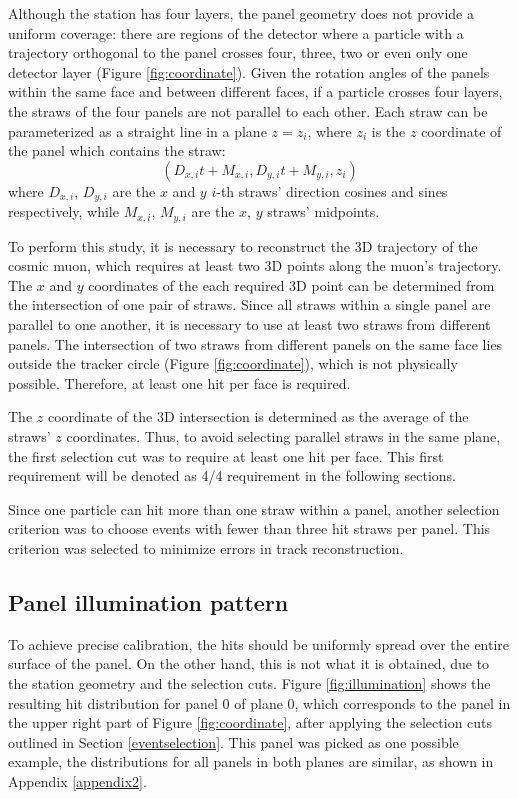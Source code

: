 Although the station has four layers, 
the panel geometry does not provide a uniform
coverage: there are regions of the 
detector where a particle with a trajectory orthogonal
to the panel crosses four, three, two or even only one 
detector layer (Figure \ref{fig:coordinate}). Given the
rotation angles of the panels within the same 
face and between different faces, if a particle
crosses four layers, the straws of the four 
panels are not parallel to each other.
Each straw can be parameterized as a straight line 
in a plane $z = z_i$, where $z_i$ is the $z$ 
coordinate of the panel which contains the straw:
\begin{equation}\label{equaretta}
    (D_{x,i}t+M_{x,i},D_{y,i}t+M_{y,i},z_i)
\end{equation}
where $D_{x,i}$, $D_{y,i}$ are the $x$ and $y$ 
$i$-th straws' direction cosines and sines respectively, 
while $M_{x,i}$, $M_{y,i}$ are the $x$, $y$ straws' midpoints.

To perform this study, it is necessary to 
reconstruct the 3D trajectory of the cosmic muon, 
which requires at least two 3D points along the muon's 
trajectory. The $x$ and $y$ coordinates of 
the each required 3D point can be determined 
from the intersection of one pair of straws. Since all straws within a single panel are parallel to 
one another, it is necessary to use at least two straws from 
different panels. The intersection of two straws from 
different panels on the same face lies outside the tracker circle 
(Figure \ref{fig:coordinate}), which is not physically possible. 
Therefore, at least one hit per face is required.

The $z$ coordinate of the 3D intersection is determined as the average of the 
straws' $z$ coordinates. Thus, to avoid selecting 
parallel straws in the same plane, 
the first selection cut 
was to require at least one hit per face. 
This first requirement will be denoted as 
4/4 requirement in the following sections.

Since one particle can hit more than one straw within a panel, 
another selection criterion was to choose events 
with fewer than three hit straws per panel. 
This criterion was selected to minimize errors 
in track reconstruction.
\subsection{Panel illumination pattern}
To achieve precise calibration, the hits should be uniformly 
spread over the entire surface of the panel.
On the other hand, this is 
not what it is obtained, due to the station geometry
and the selection cuts. 
Figure \ref{fig:illumination} shows the 
resulting hit distribution for panel 0 of
plane 0, which corresponds 
to the panel in 
the upper right part of Figure \ref{fig:coordinate}, 
after applying the selection cuts 
outlined in Section 
\ref{eventselection}. 
This panel was picked as one possible 
example, the 
distributions for all panels in 
both planes are similar, as
shown in Appendix \ref{appendix2}.

